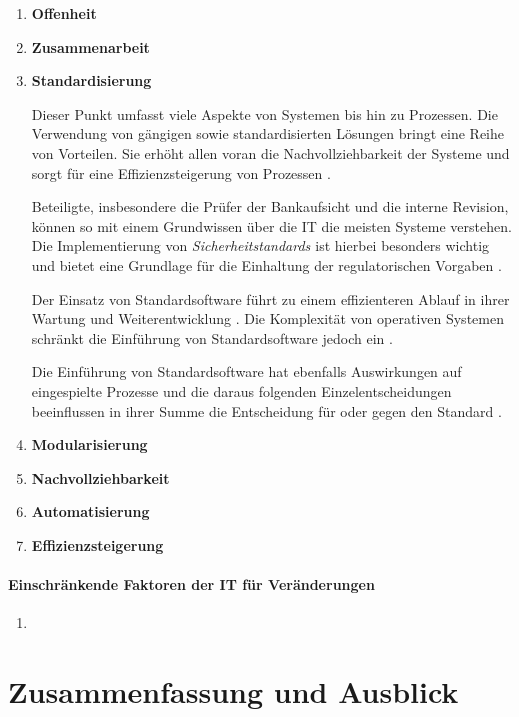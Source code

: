 \begin{enumerate}
    \item \textbf{Offenheit}
    
    \item \textbf{Zusammenarbeit}

    \item \textbf{Standardisierung} 
    
    Dieser Punkt umfasst viele Aspekte von Systemen bis hin zu Prozessen. Die Verwendung von gängigen sowie standardisierten Lösungen bringt eine Reihe von Vorteilen. Sie erhöht allen voran die Nachvollziehbarkeit der Systeme und sorgt für eine Effizienzsteigerung von Prozessen \cite{Strietzel2018, Bussmann2006, Alt2017}. 
    
    Beteiligte, insbesondere die Prüfer der Bankaufsicht und die interne Revision, können so mit einem Grundwissen über die IT die meisten Systeme verstehen. Die Implementierung von \emph{Sicherheitstandards \cite{IT-Grundschutz:2020, Disterer2013}} ist hierbei besonders wichtig und bietet eine Grundlage für die Einhaltung der regulatorischen Vorgaben \cite{MaRisk:2017, BAIT:2018}.
    
    Der Einsatz von Standardsoftware führt zu einem effizienteren Ablauf in ihrer Wartung und Weiterentwicklung \cite{Bussmann2006}. Die Komplexität von operativen Systemen schränkt die Einführung von Standardsoftware jedoch ein \cite[S.27]{Bussmann2006}. 
    
    Die Einführung von Standardsoftware hat ebenfalls Auswirkungen auf eingespielte Prozesse und die daraus folgenden Einzelentscheidungen beeinflussen in ihrer Summe die Entscheidung für oder gegen den Standard \cite[Tab.1]{Manz2018}.
    
    \item \textbf{Modularisierung}
    
    \item \textbf{Nachvollziehbarkeit}
    
    \item \textbf{Automatisierung}
    
    \item \textbf{Effizienzsteigerung}
\end{enumerate}


\paragraph{Einschränkende Faktoren der IT für Veränderungen}
\begin{enumerate}
    \item 
\end{enumerate}


\section{Zusammenfassung und Ausblick}